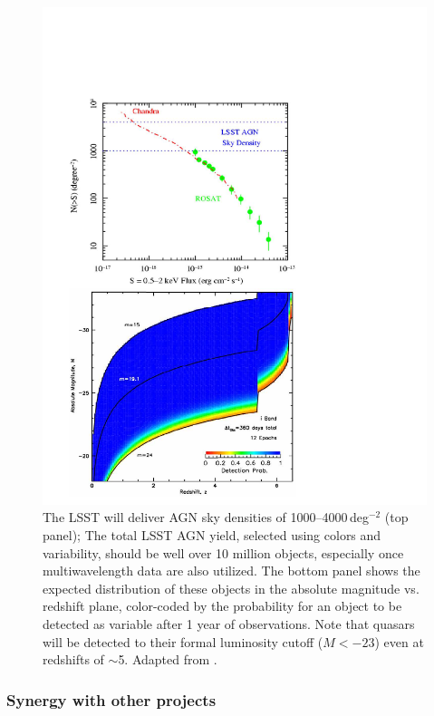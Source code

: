 \begin{figure}
\includegraphics[width=1.0\hsize,clip]{panels3}
\caption{The LSST will deliver AGN sky densities of 1000--4000\,deg$^{-2}$ (top panel);
The total LSST AGN yield, selected using colors and variability, should be well over
10 million objects, especially once multiwavelength data are also utilized.
The bottom panel shows the expected distribution of these objects in the
absolute magnitude vs. redshift plane, color-coded by the probability for
an object to be
detected as variable after 1 year of observations. Note that quasars will
be detected to their formal luminosity cutoff ($M< -23$) even at redshifts
of $\sim$5. Adapted from \citet{2007AAS...21113709B}.}
\label{Fig:panels3}
\end{figure}

\subsubsection{  Synergy with other projects }

